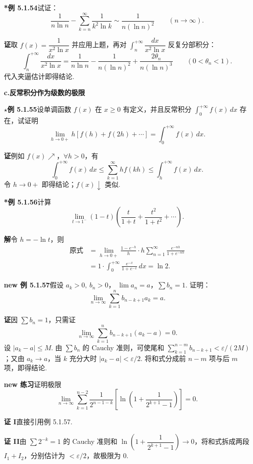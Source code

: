 \documentclass[UTF8, 12pt, fontset=fandol, oneside]{ctexart}
\begin{document}
\noindent\textbf{*例 5.1.54}\quad 试证：
\[
  \frac1{n\ln n}-\sum_{k=n}^{\infty}\frac1{k^2\ln k}
  \sim\frac1{n(\ln n)^2}\qquad(n\to\infty).
\]

\noindent\textbf{证}\quad 取 $f(x)=\dfrac1{x^2\ln x}$ 并应用上题，再对
$\displaystyle\int_n^{+\infty}\dfrac{dx}{x^2\ln x}$ 反复分部积分：
\[
  \int_n^{+\infty}\frac{dx}{x^2\ln x}
  =\frac1{n\ln n}-\frac1{n(\ln n)^2}
  +\frac{2\theta_n}{n(\ln n)^3}\qquad(0<\theta_n<1).
\]
代入夹逼估计即得结论.

\noindent\textbf{c.\quad 反常积分作为级数的极限}

\noindent\textbf{$\star$例 5.1.55}\quad 设单调函数 $f(x)$ 在 $x\ge0$ 有定义，并且反常积分 $\displaystyle\int_0^{+\infty}f(x)\,dx$ 存在，试证明
\[
  \lim_{h\to0+}h[f(h)+f(2h)+\cdots]
  =\int_0^{+\infty}f(x)\,dx.
\]

\noindent\textbf{证}\quad 例如 $f(x)\nearrow$，$\forall h>0$，有
\[
  \int_0^{+\infty}f(x)\,dx
  \le\sum_{k=1}^{\infty}hf(kh)
  \le\int_h^{+\infty}f(x)\,dx.
\]
令 $h\to0+$ 即得结论；$f(x)\downarrow$ 类似.

\noindent\textbf{*例 5.1.56}\quad 计算
\[
  \lim_{t\to1^-}(1-t)\left(\frac t{1+t}+\frac{t^2}{1+t^2}+\cdots\right).
\]

\noindent\textbf{解}\quad 令 $h=-\ln t$，则
\[
\begin{aligned}
\text{原式}
&=\lim_{h\to0+}\frac{1-e^{-h}}h\cdot
h\sum_{n=1}^{\infty}\frac{e^{-nh}}{1+e^{-nh}}\\
&=1\cdot\int_0^{+\infty}\frac{e^{-x}}{1+e^{-x}}\,dx=\ln2.
\end{aligned}
\]

\noindent\textbf{new 例 5.1.57}\quad 假设 $a_k>0,\ b_n>0$，
$\lim a_n=a$，$\displaystyle\sum b_n=1$. 证明：
\[
  \lim_{n\to\infty}\sum_{k=1}^n b_{n-k+1}a_k=a.
\]

\noindent\textbf{证}\quad 因 $\sum b_n=1$，只需证
\[
  \lim_{n\to\infty}\sum_{k=1}^n b_{n-k+1}(a_k-a)=0.
\]
设 $|a_k-a|\le M$. 由 $\sum b_n$ 的 Cauchy 准则，可使尾和
$\sum_{k=1}^{n-m}b_{n-k+1}<\varepsilon/(2M)$；又由 $a_k\to a$，当 $k$ 充分大时 $|a_k-a|<\varepsilon/2$. 将和式分成前 $n-m$ 项与后 $m$ 项，即得结论.

\noindent\textbf{new 练习}\quad 证明极限
\[
  \lim_{n\to\infty}\sum_{k=1}^{n-2}
  \frac1{2^{n-1-k}}\left[\ln\left(1+\frac1{2^{k+1}-1}\right)\right]=0.
\]

\noindent\textbf{证 I}\quad 直接引用例 5.1.57.

\noindent\textbf{证 II}\quad 由 $\sum 2^{-k}=1$ 的 Cauchy 准则和
$\ln\left(1+\dfrac1{2^{k+1}-1}\right)\to0$，将和式拆成两段 $I_1+I_2$，分别估计为 $<\varepsilon/2$，故极限为 $0$.
\end{document}

